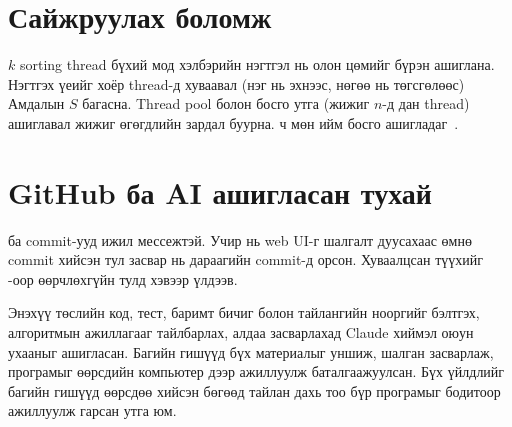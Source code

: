 \section{Сайжруулах боломж}
$k$ sorting thread бүхий мод хэлбэрийн нэгтгэл нь олон цөмийг бүрэн ашиглана. Нэгтгэх үеийг хоёр thread-д хуваавал
(нэг нь эхнээс, нөгөө нь төгсгөлөөс) Амдалын $S$ багасна. Thread pool болон босго утга (жижиг $n$-д дан thread)
ашиглавал жижиг өгөгдлийн зардал буурна.  ч мөн ийм босго ашигладаг~\cite{javadoc-arrays}.

\section{GitHub ба AI ашигласан тухай}
 ба  commit-ууд ижил мессежтэй. Учир нь web UI-г шалгалт дуусахаас өмнө commit хийсэн
тул засвар нь дараагийн commit-д орсон. Хуваалцсан түүхийг -оор өөрчлөхгүйн тулд хэвээр үлдээв.

Энэхүү төслийн код, тест, баримт бичиг болон тайлангийн нооргийг бэлтгэх, алгоритмын ажиллагааг тайлбарлах,
алдаа засварлахад Claude хиймэл оюун ухааныг ашигласан. Багийн гишүүд бүх материалыг уншиж, шалган засварлаж,
програмыг өөрсдийн компьютер дээр ажиллуулж баталгаажуулсан. Бүх  үйлдлийг багийн гишүүд өөрсдөө хийсэн
бөгөөд тайлан дахь тоо бүр програмыг бодитоор ажиллуулж гарсан утга юм.
